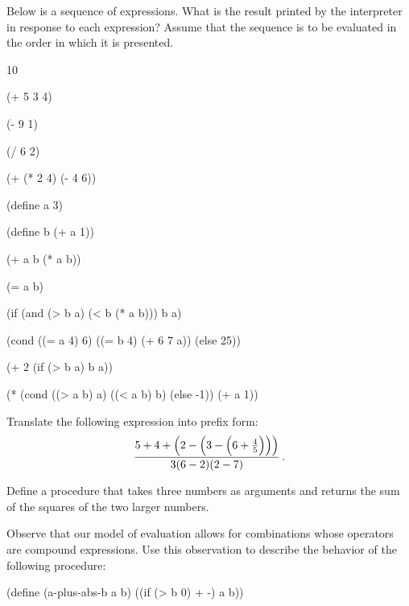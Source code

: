 \begin{exercise}
	\label{Exercise 1.1}
	Below is a sequence of expressions.
	What is the result printed by the interpreter in response to each expression?
	Assume that the sequence is to be evaluated in the order in which it is presented.
	\begin{scheme}
	  10

	  (+ 5 3 4)

	  (- 9 1)

	  (/ 6 2)

	  (+ (* 2 4) (- 4 6))

	  (define a 3)

	  (define b (+ a 1))

	  (+ a b (* a b))

	  (= a b)

	  (if (and (> b a) (< b (* a b)))
	      b
	      a)

	  (cond ((= a 4) 6)
	        ((= b 4) (+ 6 7 a))
	        (else 25))

	  (+ 2 (if (> b a) b a))

	  (* (cond ((> a b) a)
	           ((< a b) b)
	           (else -1))
	     (+ a 1))
	\end{scheme}
\end{exercise}



\begin{exercise}
	\label{Exercise 1.2}
	Translate the following expression into prefix form:
	\[
		\frac{
			5
			+ 4
			+ \Bigl(2 - \Bigl(3 - \Bigl(6 + \frac{4}{5}\Bigr)\Bigr)\Bigr)
		}{
			3 (6 - 2) (2 - 7)
		} \,.
	\]
\end{exercise}



\begin{exercise}
	\label{Exercise 1.3}
	Define a procedure that takes three numbers as arguments and returns the sum of the squares of the two larger numbers.
\end{exercise}



\begin{exercise}
	\label{Exercise 1.4}
	Observe that our model of evaluation allows for combinations whose operators are compound expressions.
	Use this observation to describe the behavior of the following procedure:
	\begin{scheme}
	  (define (a-plus-abs-b a b)
	    ((if (> b 0) + -) a b))
	\end{scheme}
\end{exercise}



